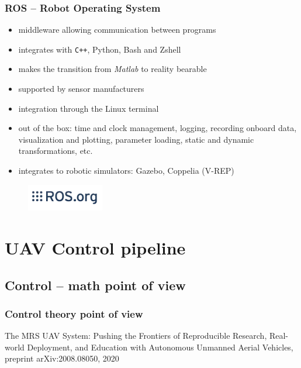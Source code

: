 \documentclass[aspectratio=1610]{beamer}
\begin{document}
  \begin{frame}
    \frametitle{ROS -- Robot Operating System}

    \begin{itemize}
      \item middleware allowing communication between programs
      \item integrates with \texttt{C++}, Python, Bash and Zshell
      \item makes the transition from \emph{Matlab} to reality bearable
      \item supported by sensor manufacturers
      \item integration through the Linux terminal
      \item out of the box: time and clock management, logging, recording onboard data, visualization and plotting, parameter loading, static and dynamic transformations, etc.
      \item integrates to robotic simulators: Gazebo, Coppelia (V-REP)
    \end{itemize}

    \begin{figure}
      \includegraphics[width=0.3\textwidth]{fig/ros_logo.jpg}
    \end{figure}

  \end{frame}



  \section{UAV Control pipeline}
  \subsection{Control -- math point of view}

  \begin{frame}
    \frametitle{Control theory point of view}

    \begin{figure}
      \begin{adjustbox}{max totalsize={1.0\textwidth}{.85\textheight}, center}
        
      \end{adjustbox}
    \end{figure}

    \begin{block}{\cite{baca2020mrs}}
      The MRS UAV System: Pushing the Frontiers of Reproducible Research, Real-world Deployment, and Education with Autonomous Unmanned Aerial Vehicles, preprint arXiv:2008.08050, 2020
    \end{block}

  \end{frame}
\end{document}
